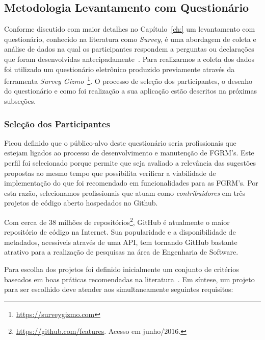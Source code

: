 \subsection{Metodologia Levantamento com Questionário}
\label{sub:sug_melhoria_metodologia_levantamento}

Conforme discutido com maior detalhes no Capítulo~\ref{ch:} um levantamento com
questionário, conhecido na literatura como \textit{Survey}, é uma abordagem de
coleta e análise de dados na qual os participantes respondem a perguntas ou
declarações que foram desenvolvidas antecipadamente~\cite{kasunic2005designing}.
Para realizarmos a coleta dos dados foi utilizado um questionário eletrônico
produzido previamente através da ferramenta \textit{Survey
	Gizmo}~\footnote{\url{https://surveygizmo.com}}. O processo de seleção dos
participantes, o desenho do questionário e como foi realização a sua aplicação
estão descritos na próximas subseções.

\subsubsection{Seleção dos Participantes}
\label{ssub:sug_melhoria_selecao_participantes}

Ficou definido que o público-alvo deste questionário seria profissionais que
estejam ligados ao processo de desenvolvimento e manutenção de FGRM's. Este
perfil foi selecionado porque permite que seja avaliado a relevância das
sugestões propostas ao mesmo tempo que possibilita verificar a viabilidade de
implementação do que foi recomendado em funcionalidades para as FGRM's. Por esta
razão, selecionamos profissionais que atuam como \textit{contribuidores} em três
projetos de código aberto hospedados no Github.


Com cerca de 38 milhões de
repositórios\footnote{\url{https://github.com/features}. Acesso em junho/2016.},
GitHub é atualmente o maior repositório de código na Internet. Sua popularidade
e a disponibilidade de metadados, acessíveis através de uma API, tem tornando
GitHub bastante atrativo para a realização de pesquisas na área de Engenharia de
Software.

Para escolha dos projetos foi definido inicialmente um conjunto de critérios
baseados em boas práticas recomendadas na literatura~\cite{Bird2009}. Em
síntese, um projeto para ser escolhido deve atender aos simultaneamente
seguintes requisitos:

